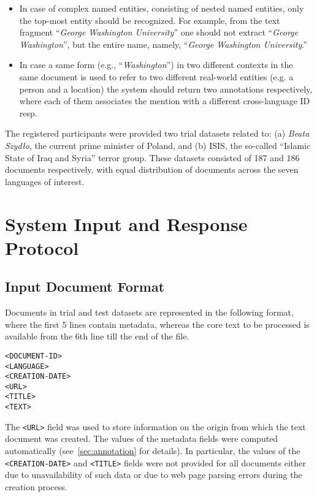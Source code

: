 \documentclass[11pt]{article}
\begin{document}
\begin{itemize}

\item In case of complex named entities, consisting of nested named
  entities, only the top-most entity should be recognized. For example,
  from the text fragment ``\textit{George Washington University}'' one
  should not extract ``\textit{George Washington}'', but the entire name,
  namely, ``\textit{George Washington University}.''

\item In case a same form (e.g., ``\textit{Washington}'') in two different
  contexts in the same document is used to refer to two different
  real-world entities (e.g. a person and a location) the system should
  return two annotations respectively, where each of them associates the
  mention with a different cross-language ID resp.

\end{itemize}


The registered participants were provided two trial datasets related to:
(a) {\em Beata Szydło}, the current prime minister of Poland, and (b)
ISIS, the so-called ``Islamic State of Iraq and Syria'' terror group.
These datasets consisted of 187 and 186 documents respectively, with
equal distribution of documents across the seven languages of interest.

\section{System Input and Response Protocol}
\label{sec:protocol}

\subsection{Input Document Format}
\label{subsec:input}

Documents in trial and test datasets are represented in the following
format, where the first 5 lines contain metadata, whereas the core text
to be processed is available from the 6th line till the end of the file.

\begin{small}
\begin{verbatim}
<DOCUMENT-ID>
<LANGUAGE>
<CREATION-DATE>
<URL>
<TITLE>
<TEXT>
\end{verbatim}
\end{small}

\noindent The \verb+<URL>+ field was used to store information on the origin from which 
the text document was created. The values of the metadata fields were computed automatically 
(see~\ref{sec:annotation} for details). In particular, the values of the \verb+<CREATION-DATE>+ 
and \verb+<TITLE>+ fields were not provided for all documents either due to unavailability 
of such data or due to web page parsing errors during the creation process. 
\end{document}
